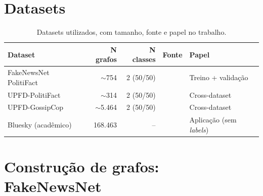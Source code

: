 
\section{Datasets}
\label{sec:datasets}

%

\begin{table}[H]\centering
\caption{Datasets utilizados, com tamanho, fonte e papel no trabalho.}
\label{tab:datasets}
\small
\begin{tabular}{lrrll}
\toprule
\textbf{Dataset} & \textbf{N grafos} & \textbf{N classes} & \textbf{Fonte} & \textbf{Papel} \\
\midrule
FakeNewsNet PolitiFact   & $\sim$754   & 2 (50/50)   & \cite{shu2020fakenewsnet}      & Treino + valida\c{c}\~ao \\
UPFD-PolitiFact          & $\sim$314   & 2 (50/50)   & \cite{dou2021upfd}             & Cross-dataset \\
UPFD-GossipCop           & $\sim$5{.}464 & 2 (50/50) & \cite{dou2021upfd}             & Cross-dataset \\
Bluesky (acad\^emico)    & 168{.}463   & --          & \cite{failla2024bluesky}       & Aplica\c{c}\~ao (sem \emph{labels}) \\
\bottomrule
\end{tabular}
\end{table}


\section{Constru\c{c}\~ao de grafos: FakeNewsNet}
\label{sec:construcao_fnn}

%

